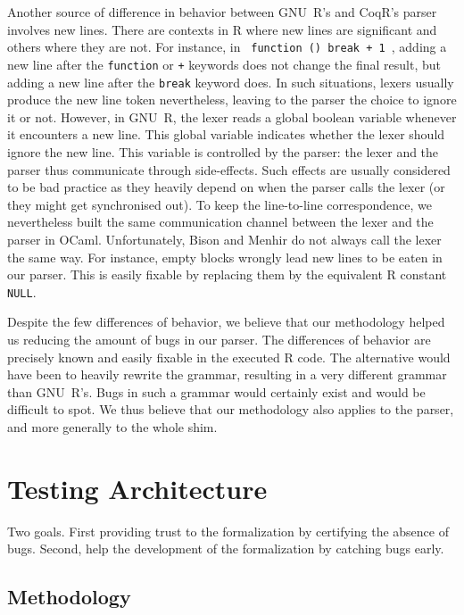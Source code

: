 \documentclass[
    sigplan,
    10pt,
    review, %
    natbib=false %
 ]{acmart}
\begin{document}
Another source of difference in behavior
between GNU~R's and CoqR's parser
involves new lines.
There are contexts in R where new lines are significant
and others where they are not.
For instance, in \texttt{{ function () break + 1 }},
adding a new line after the \texttt{function} or \texttt{+} keywords
does not change the final result,
but adding a new line after the \texttt{break} keyword does.
%
In such situations, lexers usually produce the new line token
nevertheless, leaving to the parser the choice to ignore it or not.
However, in GNU~R, the lexer reads a global boolean variable %
whenever it encounters a new line.
This global variable indicates whether the lexer should ignore the new line.
This variable is controlled by the parser:
the lexer and the parser thus communicate through side-effects.
%
Such effects are usually considered to be bad practice
as they heavily depend on when the parser calls the lexer
(or they might get synchronised out).
%
To keep the line-to-line correspondence,
we nevertheless built the same communication channel
between the lexer and the parser in OCaml.
Unfortunately, Bison and Menhir do not always call the lexer
the same way.
%
For instance, empty blocks \texttt{{}} wrongly
lead new lines to be eaten in our parser.
This is easily fixable by replacing them
by the equivalent R constant \texttt{NULL}.

Despite the few differences of behavior,
we believe that our methodology helped us
reducing the amount of bugs in our parser.
The differences of behavior are precisely known
and easily fixable in the executed R code.
%
The alternative would have been
to heavily rewrite the grammar,
resulting in a very different grammar than GNU~R's.
Bugs in such a grammar would certainly exist
and would be difficult to spot.
%
We thus believe that our methodology also applies to the parser,
and more generally to the whole shim.


\section{Testing Architecture}
\label{sec:testing:architecture}

\todo{}

Two goals.
First providing trust to the formalization by certifying the absence of bugs.
Second, help the development of the formalization by catching bugs early.

\subsection{Methodology}
\label{sec:test:methodology}
\end{document}
